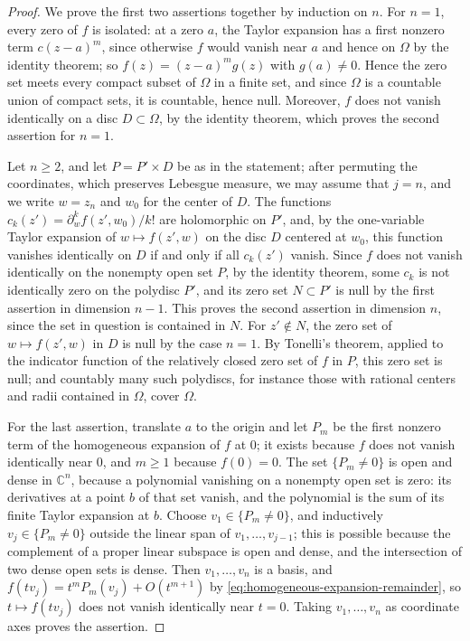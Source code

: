 \begin{proof}
We prove the first two assertions together by induction on $n$. For $n=1$, every zero of $f$ is isolated: at a zero $a$, the Taylor expansion has a first nonzero term $c(z-a)^m$, since otherwise $f$ would vanish near $a$ and hence on $\Omega$ by the identity theorem; so $f(z)=(z-a)^mg(z)$ with $g(a)\neq0$. Hence the zero set meets every compact subset of $\Omega$ in a finite set, and since $\Omega$ is a countable union of compact sets, it is countable, hence null. Moreover, $f$ does not vanish identically on a disc $D\subset\Omega$, by the identity theorem, which proves the second assertion for $n=1$.

Let $n\geq2$, and let $P=P'\times D$ be as in the statement; after permuting the coordinates, which preserves Lebesgue measure, we may assume that $j=n$, and we write $w=z_n$ and $w_0$ for the center of $D$. The functions $c_k(z')=\partial_w^kf(z',w_0)/k!$ are holomorphic on $P'$, and, by the one-variable Taylor expansion of $w\mapsto f(z',w)$ on the disc $D$ centered at $w_0$, this function vanishes identically on $D$ if and only if all $c_k(z')$ vanish. Since $f$ does not vanish identically on the nonempty open set $P$, by the identity theorem, some $c_k$ is not identically zero on the polydisc $P'$, and its zero set $N\subset P'$ is null by the first assertion in dimension $n-1$. This proves the second assertion in dimension $n$, since the set in question is contained in $N$. For $z'\notin N$, the zero set of $w\mapsto f(z',w)$ in $D$ is null by the case $n=1$. By Tonelli's theorem, applied to the indicator function of the relatively closed zero set of $f$ in $P$, this zero set is null; and countably many such polydiscs, for instance those with rational centers and radii contained in $\Omega$, cover $\Omega$.

For the last assertion, translate $a$ to the origin and let $P_m$ be the first nonzero term of the homogeneous expansion of $f$ at $0$; it exists because $f$ does not vanish identically near $0$, and $m\geq1$ because $f(0)=0$. The set $\{P_m\neq0\}$ is open and dense in $\mathbb C^n$, because a polynomial vanishing on a nonempty open set is zero: its derivatives at a point $b$ of that set vanish, and the polynomial is the sum of its finite Taylor expansion at $b$. Choose $v_1\in\{P_m\neq0\}$, and inductively $v_j\in\{P_m\neq0\}$ outside the linear span of $v_1,\ldots,v_{j-1}$; this is possible because the complement of a proper linear subspace is open and dense, and the intersection of two dense open sets is dense. Then $v_1,\ldots,v_n$ is a basis, and $f(tv_j)=t^mP_m(v_j)+O(t^{m+1})$ by \eqref{eq:homogeneous-expansion-remainder}, so $t\mapsto f(tv_j)$ does not vanish identically near $t=0$. Taking $v_1,\ldots,v_n$ as coordinate axes proves the assertion.
\end{proof}

